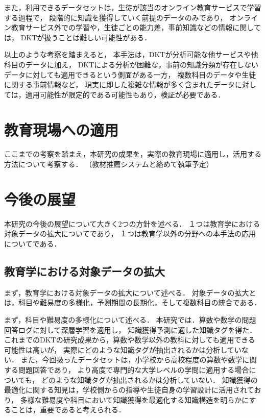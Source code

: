 また，利用できるデータセットは，生徒が該当のオンライン教育サービスで学習する過程で，
段階的に知識を獲得していく前提のデータのみであり，
オンライン教育サービス外での学習や，生徒ごとの能力差，事前知識などの情報に関しては，
DKTが扱うことは難しい可能性がある．


以上のような考察を踏まえると，
本手法は，DKTが分析可能な他サービスや他科目のデータに加え，
DKTによる分析が困難な，事前の知識分類が存在しないデータに対しても適用できるという側面がある一方，
複数科目のデータや生徒に関する事前情報など，
現実に即した複雑な情報が多く含まれたデータに対しては，適用可能性が限定的である可能性もあり，検証が必要である．


\section{教育現場への適用}
ここまでの考察を踏まえ，本研究の成果を，実際の教育現場に適用し，活用する方法について考察する．
（教材推薦システムと絡めて執筆予定）





\section{今後の展望}
本研究の今後の展望について大きく2つの方針を述べる．
１つは教育学における対象データの拡大についてであり，
１つは教育学以外の分野への本手法の応用についてである．


\subsection{教育学における対象データの拡大}
まず，教育学における対象データの拡大について述べる．
対象データの拡大とは，科目や難易度の多様化，予測期間の長期化，そして複数科目の統合である．


まず，科目や難易度の多様化について述べる．
本研究では．算数や数学の問題回答ログに対して深層学習を適用し，
知識獲得予測に適した知識タグを得た．
これまでのDKTの研究成果から，算数や数学以外の教科に対しても適用できる可能性は高いが，
実際にどのような知識タグが抽出されるかは分析していない．
また，今回扱ったデータセットは，小学校から高校程度の算数や数学に関する問題回答であり，
より高度で専門的な大学レベルの学問に適用する場合についても，
どのような知識タグが抽出されるかは分析していない．
知識獲得の最適化に関する知見は，学校側からの指導や生徒自身の学習設計に活用されており，
多様な難易度や科目において知識獲得を最適化する知識構造を明らかにすることは，重要であると考えられる．


